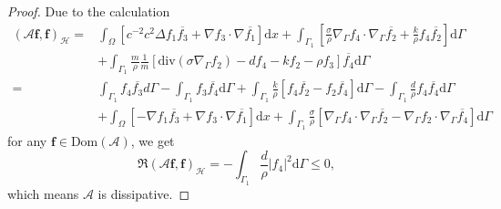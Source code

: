 \documentclass[10pt]{elsarticle}
\begin{document}
\begin{proof}
Due to the calculation
\begin{equation*}  
\begin{split}
(\mathcal{A}\mathbf{ f}, \mathbf{f})_{\mathcal{H}} =& \int_{\Omega}\left[c^{-2}c^2\Delta f_1{\overline{f_{3}}} +\nabla f_3\cdot{\nabla \overline{f_1}}\right]\mathrm{d}x+ \int_{\Gamma_{1}}\left[\frac{\sigma}{\rho}\nabla_{\Gamma} f_4\cdot{\nabla_{\Gamma} \overline{f_2}} + \frac{k}{\rho}f_4{\overline{f_{2}}}\right]\mathrm{d}\Gamma\\
&+\int_{\Gamma_{1}}\frac{m}{\rho}  \frac{1}{m}\left[\mathrm{div}(\sigma\nabla_{\Gamma}f_2) -d f_4-k f_2 -\rho f_3\right]  {\overline{f_{4}}} \mathrm{d}\Gamma\\
=& \int_{\Gamma_1} f_4{\overline{f_{3}}}d\Gamma - \int_{\Gamma_{1}}f_3 {\overline{f_{4}}} \mathrm{d}\Gamma + \int_{\Gamma_{1}}\frac{k}{\rho}\left[f_4{\overline{f_{2}}} - f_{2}\overline{ f_4} \right]\mathrm{d}\Gamma - \int_{\Gamma_{1}}\frac{d}{\rho}f_4 {\overline{f_{4}}} \mathrm{d}\Gamma\\
&+\int_{\Omega}\left[-\nabla f_1{\overline{f_{3}}} +\nabla f_3\cdot{\nabla \overline{f_1}}\right]\mathrm{d}x+\int_{\Gamma_{1}}\frac{\sigma}{\rho}\left[\nabla_{\Gamma} f_4\cdot{\nabla_{\Gamma} \overline{f_2}} - {\nabla_{\Gamma}{f_2}} \cdot \nabla_{\Gamma} \overline{f_4}\right]\mathrm{d}\Gamma
\end{split}
\end{equation*}
for any $\mathbf{ f}\in\mathrm{Dom}(\mathcal{A})$, we get 
\[
\Re(\mathcal{A}\mathbf{ f}, \mathbf{f})_{\mathcal{H}} = - \int_{\Gamma_{1}}\frac{d}{\rho}|f_4 |^2 \mathrm{d}\Gamma \leqslant 0,
\]
which means $\mathcal{A}$ is dissipative. 


\end{proof}
\end{document}
